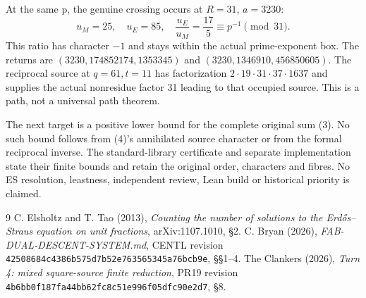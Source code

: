 \documentclass[11pt,reqno]{amsart}
\begin{document}
At the same p, the genuine crossing occurs at $R=31$, $a=3230$:
\[
 u_M=25,\quad u_E=85,\quad \frac{u_E}{u_M}=\frac{17}{5}\equiv p^{-1}\pmod{31}.
\]
This ratio has character $-1$ and stays within the actual prime-exponent box.
The returns are $(3230,174852174,1353345)$ and $(3230,1346910,456850605)$.
The reciprocal source at $q=61,t=11$ has factorization
$2\cdot19\cdot31\cdot37\cdot1637$ and supplies the actual nonresidue factor 31
leading to that occupied source. This is a path, not a universal path theorem.

The next target is a positive lower bound for the complete original sum (3).
No such bound follows from (4)'s annihilated source character or from the formal
reciprocal inverse. The standard-library certificate and separate implementation
state their finite bounds and retain the original order, characters and fibres.
No ES resolution, leastness, independent review, Lean build or historical
priority is claimed.

\begin{thebibliography}{9}
 C. Elsholtz and T. Tao (2013), \emph{Counting the number of solutions to the
Erd\H{o}s--Straus equation on unit fractions}, arXiv:1107.1010, \S2.
 C. Bryan (2026), \emph{FAB-DUAL-DESCENT-SYSTEM.md}, CENTL revision
\texttt{42508684c4386b575d7b52e763565345a76bcb9e}, \S\S1--4.
 The Clankers (2026), \emph{Turn 4: mixed square-source finite reduction},
PR19 revision \texttt{4b6bb0f187fa44bb62fc8c51e996f05dfc90e2d7}, \S8.
\end{thebibliography}
\end{document}
